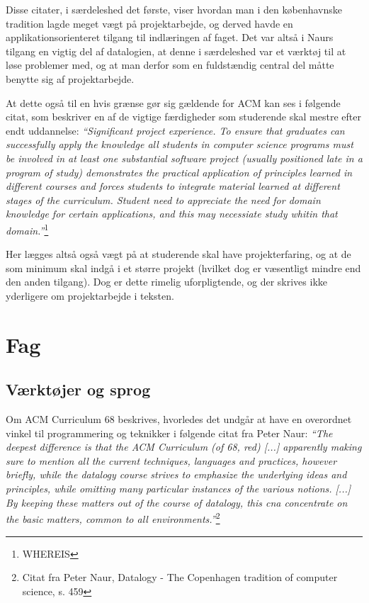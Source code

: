 \documentclass[10pt,a4paper]{article}
\newcommand{\citat}[2]{\vspace{0.2cm}\newline\textit{``#1''}\hspace{0.1cm}\footnote{#2}\vspace{0.2cm}\newline}
\begin{document}
Disse citater, i særdeleshed det første, viser hvordan man i den københavnske tradition lagde meget vægt på projektarbejde, og derved havde en applikationsorienteret tilgang til indlæringen af faget. Det var altså i Naurs tilgang en vigtig del af datalogien, at denne i særdeleshed var et værktøj til at løse problemer med, og at man derfor som en fuldstændig central del måtte benytte sig af projektarbejde.

At dette også til en hvis grænse gør sig gældende for ACM kan ses i følgende citat, som beskriver en af de vigtige færdigheder som studerende skal mestre efter endt uddannelse:
\citat{\emph{Significant project experience}. To ensure that graduates can successfully apply the knowledge all students in computer science programs must be involved in at least one substantial software project (usually positioned late in a program of study) demonstrates the practical application of principles learned in different courses and forces students to integrate material learned at different stages of the curriculum. Student need to appreciate the need for domain knowledge for certain applications, and this may necessiate study whitin that domain.}{WHEREIS}

Her lægges altså også vægt på at studerende skal have projekterfaring, og at de som minimum skal indgå i et større projekt (hvilket dog er væsentligt mindre end den anden tilgang). Dog er dette rimelig uforpligtende, og der skrives ikke yderligere om projektarbejde i teksten.

\section{Fag}
\subsection{Værktøjer og sprog}
Om ACM Curriculum 68 beskrives, hvorledes det undgår at have en overordnet vinkel til programmering og teknikker i følgende citat fra Peter Naur:
\citat{The deepest difference is that the ACM Curriculum (of 68, red) [...] apparently making sure to mention all the current techniques, languages and practices, however briefly, while the datalogy course strives to emphasize the underlying ideas and principles, while omitting many particular instances of the various notions. [...] By keeping these matters out of the course of datalogy, this cna concentrate on the basic matters, common to all environments.}{Citat fra Peter Naur, Datalogy - The Copenhagen tradition of computer science, s. 459}
\end{document}
